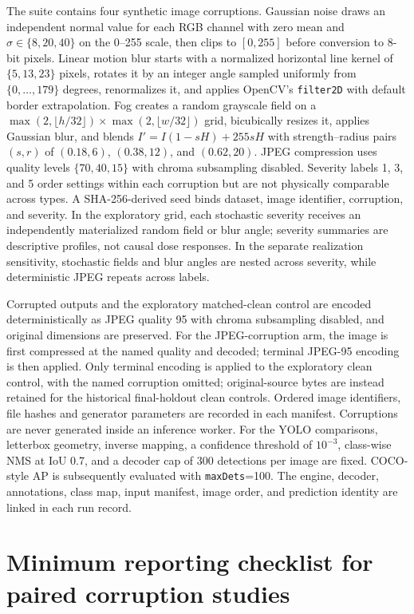 \documentclass[10pt]{article}
\begin{document}
The suite contains four synthetic image corruptions. Gaussian noise draws an independent normal value for each RGB channel with zero mean and $\sigma\in\{8,20,40\}$ on the 0--255 scale, then clips to $[0,255]$ before conversion to 8-bit pixels. Linear motion blur starts with a normalized horizontal line kernel of $\{5,13,23\}$ pixels, rotates it by an integer angle sampled uniformly from $\{0,\ldots,179\}$ degrees, renormalizes it, and applies OpenCV's \texttt{filter2D} with default border extrapolation. Fog creates a random grayscale field on a $\max(2,\lfloor h/32\rfloor)\times\max(2,\lfloor w/32\rfloor)$ grid, bicubically resizes it, applies Gaussian blur, and blends $I'=I(1-sH)+255sH$ with strength--radius pairs $(s,r)$ of $(0.18,6)$, $(0.38,12)$, and $(0.62,20)$. JPEG compression uses quality levels $\{70,40,15\}$ with chroma subsampling disabled. Severity labels 1, 3, and 5 order settings within each corruption but are not physically comparable across types. A SHA-256-derived seed binds dataset, image identifier, corruption, and severity. In the exploratory grid, each stochastic severity receives an independently materialized random field or blur angle; severity summaries are descriptive profiles, not causal dose responses. In the separate realization sensitivity, stochastic fields and blur angles are nested across severity, while deterministic JPEG repeats across labels.

Corrupted outputs and the exploratory matched-clean control are encoded deterministically as JPEG quality 95 with chroma subsampling disabled, and original dimensions are preserved. For the JPEG-corruption arm, the image is first compressed at the named quality and decoded; terminal JPEG-95 encoding is then applied. Only terminal encoding is applied to the exploratory clean control, with the named corruption omitted; original-source bytes are instead retained for the historical final-holdout clean controls. Ordered image identifiers, file hashes and generator parameters are recorded in each manifest. Corruptions are never generated inside an inference worker. For the YOLO comparisons, letterbox geometry, inverse mapping, a confidence threshold of $10^{-3}$, class-wise NMS at IoU 0.7, and a decoder cap of 300 detections per image are fixed. COCO-style AP is subsequently evaluated with \texttt{maxDets}=100. The engine, decoder, annotations, class map, input manifest, image order, and prediction identity are linked in each run record.


\FloatBarrier

\section{Minimum reporting checklist for paired corruption studies}
\end{document}
